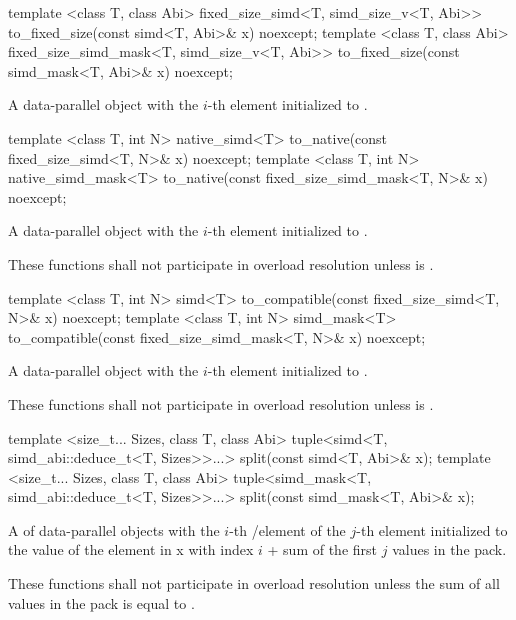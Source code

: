 \begin{itemdecl}
template <class T, class Abi>
fixed_size_simd<T, simd_size_v<T, Abi>> to_fixed_size(const simd<T, Abi>& x) noexcept;
template <class T, class Abi>
fixed_size_simd_mask<T, simd_size_v<T, Abi>> to_fixed_size(const simd_mask<T, Abi>& x) noexcept;
\end{itemdecl}
\begin{itemdescr}
  \pnum\returns A data-parallel object with the $i$-th element initialized to  \foralli.
\end{itemdescr}

\begin{itemdecl}
template <class T, int N> native_simd<T> to_native(const fixed_size_simd<T, N>& x) noexcept;
template <class T, int N> native_simd_mask<T> to_native(const fixed_size_simd_mask<T, N>& x) noexcept;
\end{itemdecl}
\begin{itemdescr}
  \pnum\returns A data-parallel object with the $i$-th element initialized to  \foralli.

  \pnum\remarks These functions shall not participate in overload resolution unless  is \true.
\end{itemdescr}

\begin{itemdecl}
template <class T, int N> simd<T> to_compatible(const fixed_size_simd<T, N>& x) noexcept;
template <class T, int N> simd_mask<T> to_compatible(const fixed_size_simd_mask<T, N>& x) noexcept;
\end{itemdecl}
\begin{itemdescr}
  \pnum\returns A data-parallel object with the $i$-th element initialized to  \foralli.

  \pnum\remarks These functions shall not participate in overload resolution unless  is \true.
\end{itemdescr}

\begin{itemdecl}
template <size_t... Sizes, class T, class Abi>
tuple<simd<T, simd_abi::deduce_t<T, Sizes>>...> split(const simd<T, Abi>& x);
template <size_t... Sizes, class T, class Abi>
tuple<simd_mask<T, simd_abi::deduce_t<T, Sizes>>...> split(const simd_mask<T, Abi>& x);
\end{itemdecl}
\begin{itemdescr}
  \pnum\returns A  of data-parallel objects with the $i$-th \simd/\mask element of the $j$-th  element initialized to the value of the element in \code x with index $i$ + sum of the first $j$ values in the  pack.

  \pnum\remarks These functions shall not participate in overload resolution unless the sum of all values in the  pack is equal to .
\end{itemdescr}

